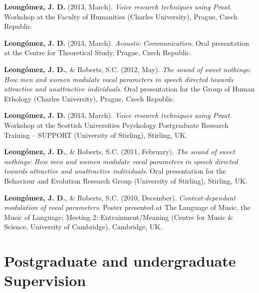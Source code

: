 \documentclass[11pt, a4paper]{awesome-cv}
\begin{document}
\textbf{Leongómez, J. D.} (2013, March). \emph{Voice research techniques
using Praat}. Workshop at the Faculty of Humanities (Charles
University), Prague, Czech Republic.

\textbf{Leongómez, J. D.} (2013, March). \emph{Acoustic Communication}.
Oral presentation at the Centre for Theoretical Study, Prague, Czech
Republic.

\textbf{Leongómez, J. D.}, \& Roberts, S.C. (2012, May). \emph{The sound
of sweet nothings: How men and women modulate vocal parameters in speech
directed towards attractive and unattractive individuals}. Oral
presentation for the Group of Human Ethology (Charles University),
Prague, Czech Republic.

\textbf{Leongómez, J. D.} (2013, March). \emph{Voice research techniques
using Praat}. Workshop at the Scottish Universities Psychology
Postgraduate Research Training -- SUPPORT (University of Stirling),
Stirling, UK.

\textbf{Leongómez, J. D.}, \& Roberts, S.C. (2011, February). \emph{The
sound of sweet nothings: How men and women modulate vocal parameters in
speech directed towards attractive and unattractive individuals}. Oral
presentation for the Behaviour and Evolution Research Group (University
of Stirling), Stirling, UK.

\textbf{Leongómez, J. D.}, \& Roberts, S.C. (2010, December).
\emph{Context-dependant modulation of vocal parameters}. Poster
presented at The Language of Music, the Music of Language; Meeting 2:
Entrainment/Meaning (Centre for Music \& Science, University of
Cambridge), Cambridge, UK.

\endgroup

\hypertarget{postgraduate-and-undergraduate-supervision}{%
\section{Postgraduate and undergraduate
Supervision}\label{postgraduate-and-undergraduate-supervision}}
\end{document}
